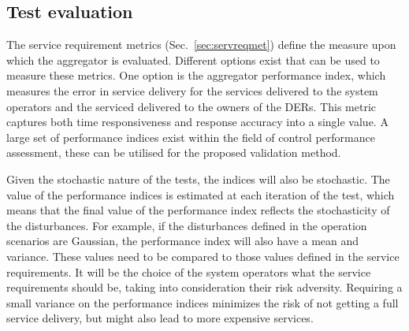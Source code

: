 


\subsection{Test evaluation}\label{sec:evaluation}
The service requirement metrics (Sec.~\ref{sec:servreqmet}) define the measure upon which the aggregator is evaluated. Different options exist that can be used to measure these metrics. One option is the aggregator performance index\cite{bondy2014performance}, which measures the error in service delivery for the services delivered to the system operators and the serviced delivered to the owners of the DERs. This metric captures both time responsiveness and response accuracy into a single value. A large set of performance indices exist within the field of control performance assessment, these can be utilised for the proposed validation method\cite{jelali2006overview}.

Given the stochastic nature of the tests, the indices will also be stochastic. The value of the performance indices is estimated at each iteration of the test, which means that the final value of the performance index reflects the stochasticity of the disturbances. For example, if the disturbances defined in the operation scenarios are Gaussian, the performance index will also have a mean and variance. These values need to be compared to those values defined in the service requirements. It will be the choice of the system operators what the service requirements should be, taking into consideration their risk adversity. Requiring a small variance on the performance indices minimizes the risk of not getting a full service delivery, but might also lead to more expensive services.

